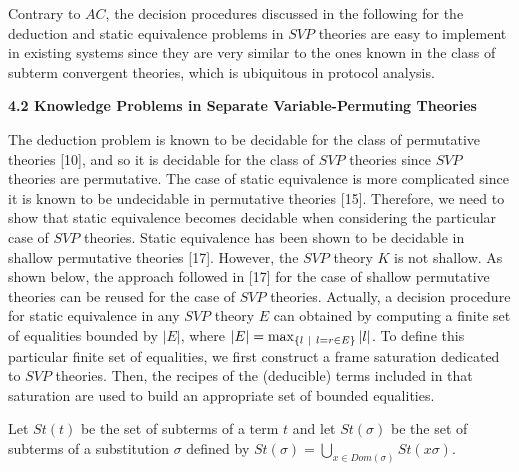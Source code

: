 \documentclass[10pt,a4paper]{amsart}
\begin{document}
 
Contrary to $AC$, the decision procedures discussed in the following for the deduction and static equivalence problems in $\mathit{SVP}$ theories are easy to implement in existing systems since they are very similar to the ones known in the class of subterm convergent theories, which is ubiquitous in protocol analysis.\par
 
 
 
 
\par\medskip\noindent\textbf{4.2 Knowledge Problems in Separate Variable-Permuting Theories}\par
 
 
The deduction problem is known to be decidable for the class of permutative theories [10], and so it is decidable for the class of $\mathit{SVP}$ theories since $\mathit{SVP}$ theories are permutative. The case of static equivalence is more complicated since it is known to be undecidable in permutative theories [15]. Therefore, we need to show that static equivalence becomes decidable when considering the particular case of $\mathit{SVP}$ theories. Static equivalence has been shown to be decidable in shallow permutative theories [17]. However, the $\mathit{SVP}$ theory $K$ is not shallow. As shown below, the approach followed in [17] for the case of shallow permutative theories can be reused for the case of $\mathit{SVP}$ theories. Actually, a decision procedure for static equivalence in any $\mathit{SVP}$ theory $E$ can obtained by computing a finite set of equalities bounded by $|E|$, where $|E|=\max_{\{l\leavevmode\nobreak\ |\leavevmode\nobreak\ l=r\in E\}}|l|$. To define this particular finite set of equalities, we first construct a frame saturation dedicated to $\mathit{SVP}$ theories. Then, the recipes of the (deducible) terms included in that saturation are used to build an appropriate set of bounded equalities.\par
 
 
 
Let $St(t)$ be the set of subterms of a term $t$ and let $St(\sigma)$ be the set of subterms of a substitution $\sigma$ defined by $St(\sigma)=\bigcup_{x\in Dom(\sigma)}St(x\sigma)$.\par
 
\end{document}
